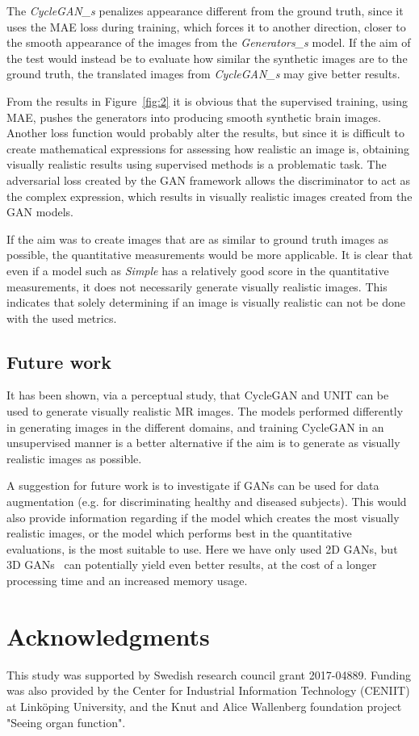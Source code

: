 \documentclass{article}
\begin{document}
The \emph{CycleGAN\_s} penalizes appearance different from the ground truth, since it uses the MAE loss during training, which forces it to another direction, closer to the smooth appearance of the images from the \emph{Generators\_s} model. If the aim of the test would instead be to evaluate how similar the synthetic images are to the ground truth, the translated images from \emph{CycleGAN\_s} may give better results.

From the results in Figure~\ref{fig:2} it is obvious that the supervised training, using MAE, pushes the generators into producing smooth synthetic brain images. Another loss function would probably alter the results, but since it is difficult to create mathematical expressions for assessing how realistic an image is, obtaining visually realistic results using supervised methods is a problematic task. The adversarial loss created by the GAN framework allows the discriminator to act as the complex expression, which results in visually realistic images created from the GAN models.

If the aim was to create images that are as similar to ground truth images as possible, the quantitative measurements would be more applicable. It is clear that even if a model such as \emph{Simple} has a relatively good score in the quantitative measurements, it does not necessarily generate visually realistic images. This indicates that solely determining if an image is visually realistic can not be done with the used metrics.

\subsection{Future work}

It has been shown, via a perceptual study, that CycleGAN and UNIT can be used to generate visually realistic MR images. The models performed differently in generating images in the different domains, and training CycleGAN in an unsupervised manner is a better alternative if the aim is to generate as visually realistic images as possible.

A suggestion for future work is to investigate if GANs can be used for data augmentation (e.g. for discriminating healthy and diseased subjects). This would also provide information regarding if the model which creates the most visually realistic images, or the model which performs best in the quantitative evaluations, is the most suitable to use. Here we have only used 2D GANs, but 3D GANs~\cite{Nie2016,Yu2018} can potentially yield even better results, at the cost of a longer processing time and an increased memory usage.

\section{Acknowledgments}

This study was supported by Swedish research council grant 2017-04889. Funding was also provided by the Center for Industrial Information Technology (CENIIT) at Link\"{o}ping University, and the Knut and Alice Wallenberg foundation project "Seeing organ function".

\clearpage
\newpage


\end{document}
